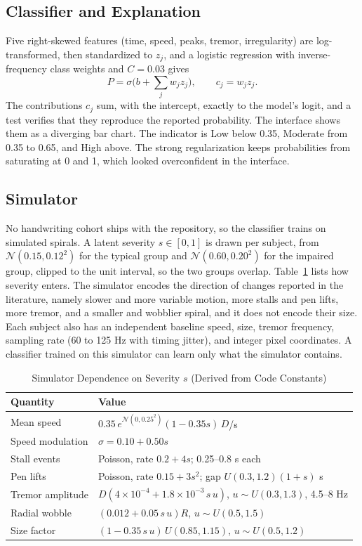 \documentclass[conference]{IEEEtran}
\begin{document}
\subsection{Classifier and Explanation}
Five right-skewed features (time, speed, peaks, tremor, irregularity) are log-transformed, then standardized to $z_j$, and a logistic regression with inverse-frequency class weights and $C=0.03$ gives
\begin{equation}
P = \sigma\Big(b+\sum_j w_j z_j\Big), \qquad c_j = w_j z_j .
\label{eq:logit}
\end{equation}
The contributions $c_j$ sum, with the intercept, exactly to the model's logit, and a test verifies that they reproduce the reported probability. The interface shows them as a diverging bar chart. The indicator is Low below 0.35, Moderate from 0.35 to 0.65, and High above. The strong regularization keeps probabilities from saturating at 0 and 1, which looked overconfident in the interface.

\subsection{Simulator}
No handwriting cohort ships with the repository, so the classifier trains on simulated spirals. A latent severity $s\in[0,1]$ is drawn per subject, from $\mathcal{N}(0.15,0.12^2)$ for the typical group and $\mathcal{N}(0.60,0.20^2)$ for the impaired group, clipped to the unit interval, so the two groups overlap. Table~\ref{tab:sim} lists how severity enters. The simulator encodes the direction of changes reported in the literature, namely slower and more variable motion, more stalls and pen lifts, more tremor, and a smaller and wobblier spiral, and it does not encode their size. Each subject also has an independent baseline speed, size, tremor frequency, sampling rate (60 to 125 Hz with timing jitter), and integer pixel coordinates. A classifier trained on this simulator can learn only what the simulator contains.

\begin{table}[t]
\centering
\caption{Simulator Dependence on Severity $s$ (Derived from Code Constants)}
\label{tab:sim}
\footnotesize
\begin{tabular}{@{}p{3.0cm}p{4.65cm}@{}}
\toprule
Quantity & Value \\
\midrule
Mean speed & $0.35\,e^{\mathcal{N}(0,0.25^2)}(1-0.35s)\,D$/s \\
Speed modulation & $\sigma=0.10+0.50s$ \\
Stall events & Poisson, rate $0.2+4s$; 0.25--0.8 s each \\
Pen lifts & Poisson, rate $0.15+3s^2$; gap $U(0.3,1.2)(1+s)$ s \\
Tremor amplitude & $D(4\!\times\!10^{-4}+1.8\!\times\!10^{-3}\,s\,u)$, $u\sim U(0.3,1.3)$, 4.5--8 Hz \\
Radial wobble & $(0.012+0.05\,s\,u)R$, $u\sim U(0.5,1.5)$ \\
Size factor & $(1-0.35\,s\,u)\,U(0.85,1.15)$, $u\sim U(0.5,1.2)$ \\
\bottomrule
\end{tabular}
\end{table}
\end{document}
